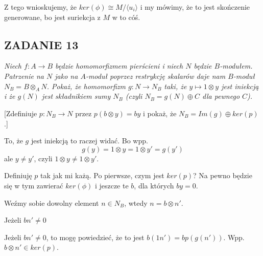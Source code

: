 \documentclass{article}
\begin{document}
Z tego wnioskujemy, że $ker(\phi)\cong M/\langle u_i\rangle$ i my mówimy, że to jest skończenie generowane, bo jest suriekcja z $M$ w to cóś.

\subsection*{ZADANIE 13}
{\slshape\color{yellow}Niech $f:A\to B$ będzie homomorfizmem pierścieni i niech $N$ będzie $B$-modułem. Patrzenie na $N$ jako na $A$-moduł poprzez restrykcję skalarów daje nam $B$-moduł $N_B=B\otimes_AN$. Pokaż, że homomorfizm $g:N\to N_B$ taki, że $y\mapsto1\otimes y$ jest iniekcją i że $g(N)$ jest składnikiem sumy $N_B$ (czyli $N_B=g(N)\oplus C$ dla pewnego $C$).

[Zdefiniuje $p:N_B\to N$ przez $p(b\otimes y)=by$ i pokaż, że $N_B=Im(g)\oplus ker(p)$.]}

To, że $g$ jest iniekcją to raczej widać. Bo wpp. 
$$g(y)=1\otimes y=1\otimes y'=g(y')$$
ale $y\neq y'$, czyli $1\otimes y\neq 1\otimes y'$.

Definiuję $p$ tak jak mi każą. Po pierwsze, czym jest $ker(p)$? Na pewno będzie się w tym zawierać $ker(\phi)$ i jeszcze te $b$, dla których $by=0$.

Weźmy sobie dowolny element $n\in N_B$, wtedy $n=b\otimes n'$. 

Jeżeli $bn'\neq 0$

Jeżeli $bn'\neq 0$, to mogę powiedzieć, że to jest $b(1n')=bp(g(n'))$. Wpp. $b\otimes n'\in ker(p)$.
\end{document}
